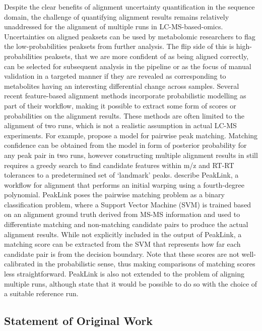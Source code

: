 Despite the clear benefits of alignment uncertainty quantification in the sequence domain, the challenge of quantifying alignment results remains relatively unaddressed for the alignment of multiple runs in LC-MS-based-omics. Uncertainties on aligned peaksets can be used by metabolomic researchers to flag the low-probabilities peaksets from further analysis. The flip side of this is high-probabilities peaksets, that we are more confident of as being aligned correctly, can be selected for subsequent analysis in the pipeline or as the focus of manual validation in a targeted manner if they are revealed as corresponding to metabolites having an interesting differential change across samples. Several recent feature-based alignment methods incorporate probabilistic modelling as part of their workflow, making it possible to extract some form of scores or probabilities on the alignment results. These methods are often limited to the alignment of two runs, which is not a realistic assumption in actual LC-MS experiments. For example, \cite{Jeong2012} propose a model for pairwise peak matching. Matching confidence can be obtained from the model in form of posterior probability for any peak pair in two runs, however constructing multiple alignment results in \cite{Jeong2012} still requires a greedy search to find candidate features within m/z and RT-RT tolerances to a predetermined set of `landmark' peaks. \cite{GhanatBari2014b} describe PeakLink, a workflow for alignment that performs an initial warping using a fourth-degree polynomial. PeakLink poses the pairwise matching problem as a binary classification problem, where a Support Vector Machine (SVM) is trained based on an alignment ground truth derived from MS-MS information and used to differentiate matching and non-matching candidate pairs to produce the actual alignment results. While not explicitly included in the output of PeakLink, a matching score can be extracted from the SVM that represents how far each candidate pair is from the decision boundary. Note that these scores are not well-calibrated in the probabilistic sense, thus making comparisons of matching scores less straightforward. PeakLink is also not extended to the problem of aligning multiple runs, although \cite{GhanatBari2014b} state that it would be possible to do so with the choice of a suitable reference run.

\subsection*{Statement of Original Work}

